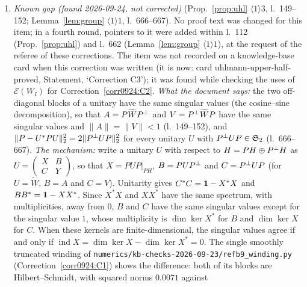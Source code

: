 \documentclass[11pt]{article}
\newcommand{\Wt}{\widetilde W}\newcommand{\kt}{\widetilde k}\newcommand{\Om}{\Omega}\newcommand{\Gm}{\Gamma}
\newcommand{\Stwo}{\mathfrak S_2}\newcommand{\Sone}{\mathfrak S_1}
\newcommand{\norm}[1]{\lVert #1\rVert}\newcommand{\abs}[1]{\lvert #1\rvert}
\begin{document}
\begin{enumerate}[label=\textbf{C\arabic*},ref=C\arabic*,leftmargin=2.6em,itemsep=2pt]
 (c) Lemma~\ref{lem:column}(c): for bounded anti-self-adjoint $Z_e$ with $\Pperp Z_eP\in\Stwo$,
 $[P,Z_e]\in\Stwo$, so $[P,e^{\tau Z_e}]\in\Stwo$ as in Lemma~\ref{lem:group} $\langle1\rangle2$,
 and $\Wt_0e^{\tau Z_e}\in\mathcal E(W_I)$.  (d) The conditions $\Pperp ZP\in\Stwo$ on
 anti-self-adjoint generators (Lemmas~\ref{lem:L1} and \ref{lem:L2},
 Theorem~\ref{thm:reduction}, Corollary~\ref{cor:extindep}, the hypotheses on $\Gs$ and $Z_e$ in
 Theorem~\ref{thm:UH}, the verdict of \S\ref{sec:verdict}) need no change: for $Z^*=-Z$ the
 second block is $PZ\Pperp=-(\Pperp ZP)^*$.
\item\label{corr0924:C3} \emph{Known gap (found 2026-09-24, not corrected)}
 (Prop.~\ref{prop:uhl} $\langle1\rangle3$, l.~149--152; Lemma~\ref{lem:group} $\langle1\rangle1$,
 l.~666--667).  No proof text was changed for this item; in a fourth round, pointers to it were
 added within l.~112 (Prop.~\ref{prop:uhl}) and l.~662 (Lemma~\ref{lem:group} $\langle1\rangle1$),
 at the request of the referee of these corrections.  The item was not recorded on a
 knowledge-base card when this correction was written (it is now: card uhlmann-upper-half-proved, Statement, `Correction C3'); it was found while checking the uses of $\mathcal E(W_I)$ for
 Correction~\ref{corr0924:C2}.
 \emph{What the document says:} the two off-diagonal blocks of a unitary have the same singular
 values (the cosine--sine decomposition), so that $A=P\Wt\Pperp$ and $V=\Pperp\Wt P$ have the same
 singular values and $\norm A=\norm V<1$ (l.~149--152), and
 $\norm{P-U^*PU}_2^2=2\norm{\Pperp UP}_2^2$ for every unitary $U$ with $\Pperp UP\in\Stwo$
 (l.~666--667).
 \emph{The mechanism:} write a unitary $U$ with respect to $H=PH\oplus P^{\perp} H$ as
 $U=\begin{pmatrix}X&B\\ C&Y\end{pmatrix}$, so that $X=PUP|_{PH}$, $B=PUP^{\perp}$ and $C=P^{\perp} UP$
 (for $U=\Wt$, $B=A$ and $C=V$).  Unitarity gives $C^*C=\mathbf 1-X^*X$ and $BB^*=\mathbf 1-XX^*$.  Since
 $X^*X$ and $XX^*$ have the same spectrum, with multiplicities, away from $0$, $B$ and $C$ have the
 same singular values except for the singular value $1$, whose multiplicity is $\dim\ker X^*$ for
 $B$ and $\dim\ker X$ for $C$.  When these kernels are finite-dimensional, the singular values agree
 if and only if $\operatorname{ind}X=\dim\ker X-\dim\ker X^*=0$.  The single smoothly truncated
 winding of \texttt{numerics/kb-checks-2026-09-23/refb9\_winding.py} (Correction~\ref{corr0924:C1})
 shows the difference: both of its blocks are Hilbert--Schmidt, with squared norms $0.0071$ against

\end{enumerate}
\end{document}
